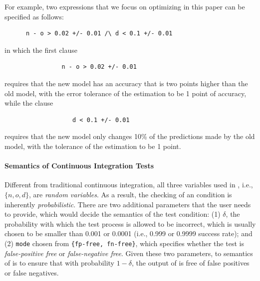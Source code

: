 \documentclass{article}
\begin{document}
For example, two expressions that we focus
on optimizing in this paper can be specified
as follows:
\begin{verbatim}
      n - o > 0.02 +/- 0.01 /\ d < 0.1 +/- 0.01
\end{verbatim}
in which the first clause
\begin{verbatim}
                n - o > 0.02 +/- 0.01
\end{verbatim}
requires that the new model has an accuracy that is
two points higher than the old model, with the error
tolerance of the estimation to be 1 point of accuracy,
while the clause
\begin{verbatim}
                   d < 0.1 +/- 0.01
\end{verbatim}
requires that the new model only changes 10\%
of the predictions made by the old model, with the
tolerance of the estimation to be 1 point.

\paragraph*{Semantics of Continuous Integration Tests}
Different from traditional continuous integration,
all three variables used in \sys, i.e., $\{n, o, d\}$,
are {\em random variables}. As a result, the 
checking of an \sys condition is inherently {\em probabilistic}. There are two additional parameters
that the user needs to provide, which would decide 
the semantics of the test condition: (1) $\delta$,
the probability with which the test process is allowed 
to be incorrect, which is usually chosen to be smaller
than 0.001 or 0.0001 (i.e., 0.999 or 0.9999 success rate); and (2) \texttt{mode} chosen from
\texttt{\{fp-free, fn-free\}}, which specifies 
whether the test is {\em false-positive free} or
{\em false-negative free}. Given these two parameters,
to semantics of \sys is to ensure that 
with probability $1 - \delta$, the output of 
\sys is free of false positives or false negatives.
\end{document}
